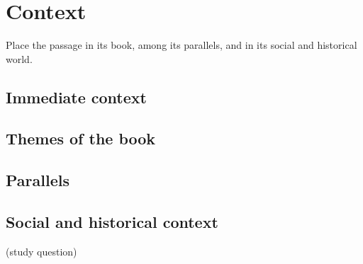 \chapter{Context}\label{cap:contexto}

\begin{objetivo}
Place the passage in its book, among its parallels, and in its social and historical world.
\end{objetivo}

\section{Immediate context}

\section{Themes of the book}

\section{Parallels}

\section{Social and historical context}

\begin{pergunta}
(study question)
\end{pergunta}
